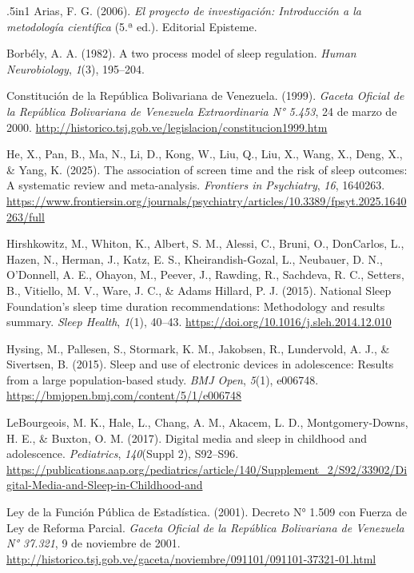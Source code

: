 \documentclass[12pt, letterpaper]{article}
\begin{document}
\begin{hangparas}{.5in}{1}
Arias, F. G. (2006). \textit{El proyecto de investigación: Introducción a la metodología científica} (5.ª ed.). Editorial Episteme.

Borbély, A. A. (1982). A two process model of sleep regulation. \textit{Human Neurobiology}, \textit{1}(3), 195--204.

Constitución de la República Bolivariana de Venezuela. (1999). \textit{Gaceta Oficial de la República Bolivariana de Venezuela Extraordinaria N° 5.453}, 24 de marzo de 2000. \url{http://historico.tsj.gob.ve/legislacion/constitucion1999.htm}

He, X., Pan, B., Ma, N., Li, D., Kong, W., Liu, Q., Liu, X., Wang, X., Deng, X., \& Yang, K. (2025). The association of screen time and the risk of sleep outcomes: A systematic review and meta-analysis. \textit{Frontiers in Psychiatry}, \textit{16}, 1640263. \url{https://www.frontiersin.org/journals/psychiatry/articles/10.3389/fpsyt.2025.1640263/full}

Hirshkowitz, M., Whiton, K., Albert, S. M., Alessi, C., Bruni, O., DonCarlos, L., Hazen, N., Herman, J., Katz, E. S., Kheirandish-Gozal, L., Neubauer, D. N., O'Donnell, A. E., Ohayon, M., Peever, J., Rawding, R., Sachdeva, R. C., Setters, B., Vitiello, M. V., Ware, J. C., \& Adams Hillard, P. J. (2015). National Sleep Foundation's sleep time duration recommendations: Methodology and results summary. \textit{Sleep Health}, \textit{1}(1), 40--43. \url{https://doi.org/10.1016/j.sleh.2014.12.010}

Hysing, M., Pallesen, S., Stormark, K. M., Jakobsen, R., Lundervold, A. J., \& Sivertsen, B. (2015). Sleep and use of electronic devices in adolescence: Results from a large population-based study. \textit{BMJ Open}, \textit{5}(1), e006748. \url{https://bmjopen.bmj.com/content/5/1/e006748}

LeBourgeois, M. K., Hale, L., Chang, A. M., Akacem, L. D., Montgomery-Downs, H. E., \& Buxton, O. M. (2017). Digital media and sleep in childhood and adolescence. \textit{Pediatrics}, \textit{140}(Suppl 2), S92--S96. \url{https://publications.aap.org/pediatrics/article/140/Supplement_2/S92/33902/Digital-Media-and-Sleep-in-Childhood-and}

Ley de la Función Pública de Estadística. (2001). Decreto N° 1.509 con Fuerza de Ley de Reforma Parcial. \textit{Gaceta Oficial de la República Bolivariana de Venezuela N° 37.321}, 9 de noviembre de 2001. \url{http://historico.tsj.gob.ve/gaceta/noviembre/091101/091101-37321-01.html}


\end{hangparas}
\end{document}
